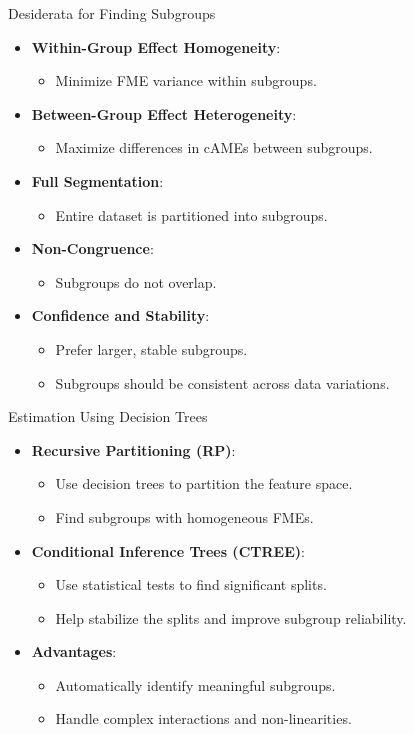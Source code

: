 \documentclass[10pt,compress,t,notes=noshow, xcolor=table]{beamer}
\begin{document}
\begin{frame}{Desiderata for Finding Subgroups}
\begin{itemize}
\item \textbf{Within-Group Effect Homogeneity}:
\begin{itemize}
\item Minimize FME variance within subgroups.
\end{itemize}
\item \textbf{Between-Group Effect Heterogeneity}:
\begin{itemize}
\item Maximize differences in cAMEs between subgroups.
\end{itemize}
\item \textbf{Full Segmentation}:
\begin{itemize}
\item Entire dataset is partitioned into subgroups.
\end{itemize}
\item \textbf{Non-Congruence}:
\begin{itemize}
\item Subgroups do not overlap.
\end{itemize}
\item \textbf{Confidence and Stability}:
\begin{itemize}
\item Prefer larger, stable subgroups.
\item Subgroups should be consistent across data variations.
\end{itemize}
\end{itemize}
\end{frame}

\begin{frame}{Estimation Using Decision Trees}
\begin{itemize}
\item \textbf{Recursive Partitioning (RP)}:
\begin{itemize}
\item Use decision trees to partition the feature space.
\item Find subgroups with homogeneous FMEs.
\end{itemize}
\item \textbf{Conditional Inference Trees (CTREE)}:
\begin{itemize}
\item Use statistical tests to find significant splits.
\item Help stabilize the splits and improve subgroup reliability.
\end{itemize}
\item \textbf{Advantages}:
\begin{itemize}
\item Automatically identify meaningful subgroups.
\item Handle complex interactions and non-linearities.
\end{itemize}
\end{itemize}
\end{frame}
\end{document}
